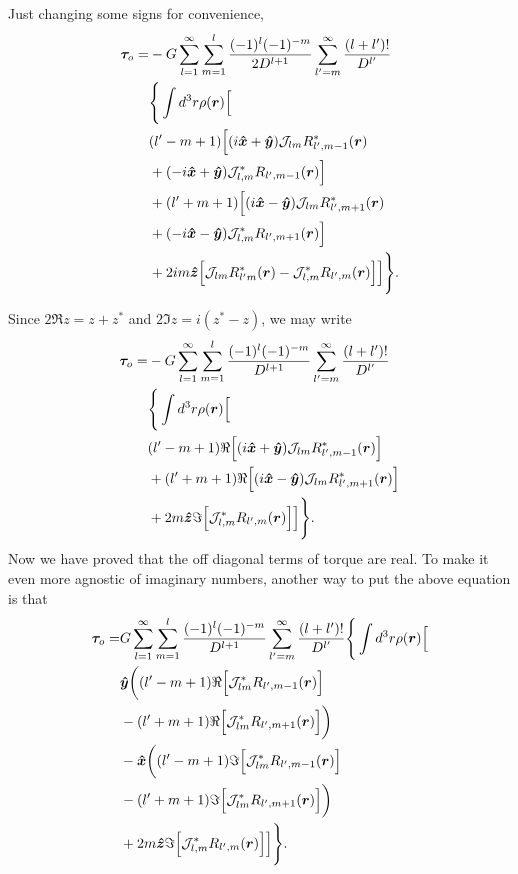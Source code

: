 \documentclass[aps,twocolumn,secnumarabic,balancelastpage,amsmath,amssymb,nofootinbib,floatfix]{revtex4-1}
\begin{document}
Just changing some signs for convenience,
\begin{equation*}
\begin{aligned}
\bm \tau_o = &-G\sum_{l=1}^\infty \sum_{m=1}^l \frac{(-1)^l(-1)^{-m}}{2D^{l+1}}\sum_{l'=m}^\infty \frac{(l+l')!}{D^{l'}}\\
&\Bigg\{\int d^3 r\rho(\bm r)\Big[\\
&(l'-m+1)\Big[(i\bm{\hat x} + \bm{\hat y})\mathcal{J}_{lm} R^*_{l',m-1}(\bm r)\\
&+(-i\bm{\hat x}+\bm{\hat y})\mathcal{J}_{l,m}^* R_{l',m-1}(\bm r)\Big]\\
&+(l'+m+1)\Big[(i\bm{\hat x}-\bm{\hat y})\mathcal{J}_{lm} R^*_{l',m+1}(\bm r)\\
&+(-i\bm{\hat x} - \bm{\hat y})\mathcal{J}_{l,m}^* R_{l',m+1}(\bm r)\Big]\\
&+2im\bm{\hat z}\Big[\mathcal{J}_{lm} R^*_{l'm}(\bm r)-\mathcal{J}_{l,m}^* R_{l',m}(\bm r)\Big]\Big]\Bigg\}.
\end{aligned}
\end{equation*}

Since $2\Re z = z + z^*$ and $2\Im z = i(z^* - z)$, we may write
\begin{equation*}
\begin{aligned}
\bm \tau_o = &-G\sum_{l=1}^\infty \sum_{m=1}^l \frac{(-1)^l(-1)^{-m}}{D^{l+1}}\sum_{l'=m}^\infty \frac{(l+l')!}{D^{l'}}\\
&\Bigg\{\int d^3 r\rho(\bm r)\Big[\\
&(l'-m+1)\Re\Big[(i\bm{\hat x}+\bm{\hat y})\mathcal{J}_{lm} R^*_{l',m-1}(\bm r)\Big]\\
&+(l'+m+1)\Re\Big[(i\bm{\hat x}-\bm{\hat y})\mathcal{J}_{lm} R^*_{l',m+1}(\bm r)\Big]\\
&+2m\bm{\hat z}\Im\Big[\mathcal{J}_{l,m}^* R_{l',m}(\bm r)\Big]\Big]\Bigg\}.
\end{aligned}
\end{equation*}
Now we have proved that the off diagonal terms of torque are real. To make it even more agnostic of imaginary numbers, another way to put the above equation is that
\begin{equation*}
\begin{aligned}
\bm \tau_o = &G\sum_{l=1}^\infty \sum_{m=1}^l \frac{(-1)^l(-1)^{-m}}{D^{l+1}}\sum_{l'=m}^\infty \frac{(l+l')!}{D^{l'}}\Bigg\{\int d^3 r\rho(\bm r)\Big[\\
&\bm{\hat y}\bigg((l'-m+1)\Re\Big[\mathcal{J}^*_{lm} R_{l',m-1}(\bm r)\Big]\\
&-(l'+m+1)\Re\Big[\mathcal{J}^*_{lm} R_{l',m+1}(\bm r)\Big]\bigg)\\
&-\bm{\hat x}\bigg((l'-m+1)\Im\Big[\mathcal{J}^*_{lm} R_{l',m-1}(\bm r)\Big]\\
&-(l'+m+1)\Im\Big[\mathcal{J}^*_{lm} R_{l',m+1}(\bm r)\Big]\bigg)\\
&+2m\bm{\hat z}\Im\Big[\mathcal{J}_{l,m}^* R_{l',m}(\bm r)\Big]\Big]\Bigg\}.
\end{aligned}
\end{equation*}
\end{document}
